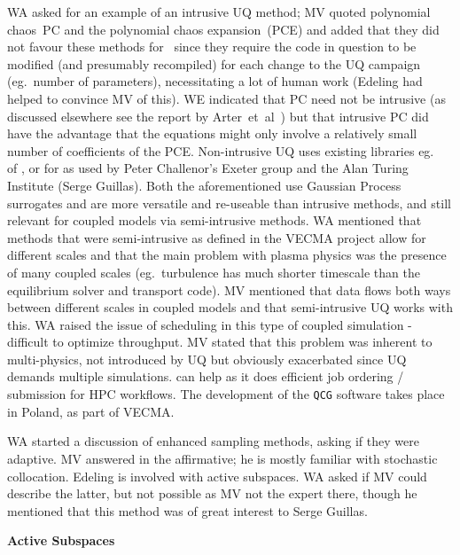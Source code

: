 WA asked for an example of an intrusive UQ method; MV quoted polynomial 
chaos~PC and the polynomial chaos expansion~(PCE) and added that they did not
favour these methods for \nep\  
since they require the code in question to be modified (and presumably 
recompiled) for each change to the UQ campaign (eg.\ number of parameters), 
necessitating a lot of human work (Edeling had helped to convince MV of this).
WE indicated that PC need not be intrusive (as discussed elsewhere see the 
report by Arter~et~al~\cite{y2re313}) but that intrusive PC did have the advantage that
the equations might only involve a relatively small number of coefficients of the PCE.
Non-intrusive UQ uses existing libraries eg.\ \I{EasySurrogate} of \F{VECMAtk}, 
or \I{MoGP} for as used by Peter Challenor's Exeter group and the Alan Turing 
Institute (Serge Guillas).  Both the aforementioned use Gaussian Process 
surrogates and are more versatile and re-useable than intrusive methods, and 
still relevant for coupled models via semi-intrusive methods.  WA mentioned that
methods that were semi-intrusive as defined in the VECMA project
allow for different scales and that the main problem 
with plasma physics was the presence of many coupled scales (eg.\ turbulence 
has much shorter timescale than the equilibrium solver and transport code).  MV 
mentioned that data flows both ways between different scales in coupled models 
and that semi-intrusive UQ works with this.  WA raised the issue of scheduling 
in this type of coupled simulation - difficult to optimize throughput.  MV 
stated that this problem was inherent to multi-physics, not introduced by UQ 
but obviously exacerbated since UQ demands multiple simulations.  \F{VECMAtk} 
\I{QCG\_PilotJob} can help as it does efficient job ordering / submission for 
HPC workflows.  The development of the {\tt QCG} software takes place in Poland,
as part of VECMA.

WA started a discussion of enhanced sampling methods, asking if they were 
adaptive.  MV answered in the affirmative; he is mostly familiar with 
stochastic collocation.  Edeling is involved with active subspaces.  WA asked 
if MV could describe the latter, but not possible as MV not the expert there, 
though he mentioned that this method was of great interest to Serge Guillas.

{\bf Active Subspaces}

